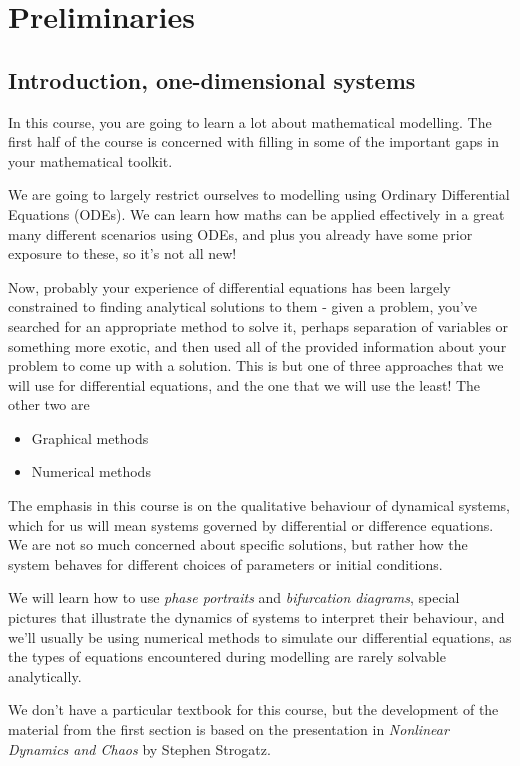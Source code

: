 \part{Preliminaries}
\chapter{Introduction, one-dimensional systems}
In this course, you are going to learn a lot about mathematical modelling.
The first half of the course is concerned with filling in some of the
important gaps in your mathematical toolkit.  

We are going to largely restrict ourselves to modelling using Ordinary
Differential Equations (ODEs). We can learn how maths can be applied
effectively in a great many different scenarios using ODEs, and plus you
already have some prior exposure to these, so it's not all new! 

Now, probably your experience of differential equations has been largely
constrained to finding analytical solutions to them - given a problem,
you've searched for an appropriate method to solve it, perhaps separation
of variables or something more exotic, and then used all of the provided
information about your problem to come up with a solution. This is but one
of three approaches that we will use for differential equations, and the
one that we will use the least! The other two are 
\begin{itemize}
    \item Graphical methods
    \item Numerical methods
\end{itemize}
The emphasis in this course is on the qualitative behaviour of dynamical
systems, which for us will mean systems governed by differential or
difference equations. We are not so much concerned about specific
solutions, but rather how the system behaves for different choices of
parameters or initial conditions.

We will learn how to use \emph{phase portraits} and \emph{bifurcation
diagrams}, special pictures that illustrate the dynamics of systems to
interpret their behaviour, and we'll usually be using numerical methods to
simulate our differential equations, as the types of equations encountered
during modelling are rarely solvable analytically.

We don't have a particular textbook for this course, but the development of
the material from the first section is based on the presentation in
\emph{Nonlinear Dynamics and Chaos} by Stephen Strogatz.

